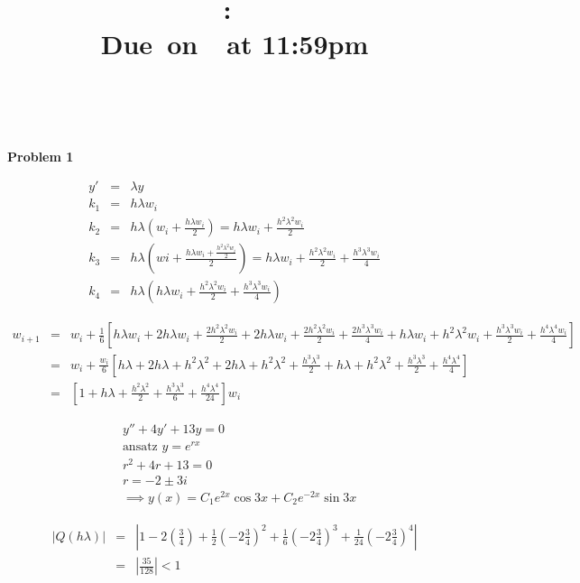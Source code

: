 \documentclass{article}
\title{
    \vspace{2in}
    \textmd{\textbf{\hmwkClass:\ \hmwkTitle}}\\
    \normalsize\vspace{0.1in}\small{Due\ on\ \hmwkDueDate\ at 11:59pm}\\
    \vspace{0.1in}\large{\textit{\hmwkClassInstructor\ \hmwkClassTime}}
    \vspace{3in}
}
\author{\hmwkAuthorName}
\date{}
\begin{document}
\maketitle

\pagebreak

\textbf{Problem 1}

\begin{eqnarray*}
y' &=& \lambda y\\
k_1 &=& h\lambda w_i\\
k_2 &=& h\lambda \left(w_i + \frac{h\lambda w_i}{2}\right) = h\lambda w_i + \frac{h^2\lambda^2 w_i}{2}\\
k_3 &=& h\lambda \left(wi +\frac{h\lambda w_i + \frac{h^2\lambda^2 w_i}{2}}{2}\right) = h\lambda w_i + \frac{h^2\lambda^2 w_i}{2}+\frac{h^3\lambda^3 w_i}{4}\\
k_4 &=& h\lambda\left(h\lambda w_i + \frac{h^2\lambda^2 w_i}{2}+\frac{h^3\lambda^3 w_i}{4}\right)
\end{eqnarray*}

\begin{eqnarray*}
w_{i+1} &=& w_i +\frac{1}{6}\left[ h\lambda w_i + 2h\lambda w_i + \frac{2h^2\lambda^2 w_i}{2} + 2h\lambda w_i + \frac{2h^2\lambda^2 w_i}{2}+\frac{2h^3\lambda^3 w_i}{4} + h\lambda w_i + h^2\lambda^2 w_i+ \frac{h^3\lambda^3 w_i}{2} + \frac{h^4\lambda^4 w_i}{4}\right]\\
&=& w_i + \frac{w_i}{6}\left[h\lambda + 2h\lambda + h^2\lambda^2 + 2h\lambda + h^2\lambda^2 + \frac{h^3\lambda^3}{2}  + h\lambda + h^2\lambda^2 + \frac{h^3\lambda^3}{2} + \frac{h^4\lambda^4}{4}\right]\\
&=& \left[1 + h\lambda + \frac{h^2\lambda^2}{2}+ \frac{h^3\lambda^3}{6}+\frac{h^4\lambda^4}{24}\right]w_i
\end{eqnarray*}

\begin{eqnarray*}
&y'' +4y' +13y = 0\\
&\text{ansatz } y = e^{rx}\\
&r^2+4r+13 = 0\\
&r = -2 \pm 3i\\
&\implies y(x) = C_1e^{2x}\cos{3x}+C_2e^{-2x}\sin{3x}
\end{eqnarray*}

\begin{eqnarray*}
|Q(h\lambda)| &=& \left|1-2(\frac{3}{4})+ \frac{1}{2}\left(-2\frac{3}{4}\right)^2 + \frac{1}{6}\left(-2\frac{3}{4}\right)^3 + \frac{1}{24}\left(-2\frac{3}{4}\right)^4\right|\\
&=&\left|\frac{35}{128}\right| < 1
\end{eqnarray*}
\end{document}
